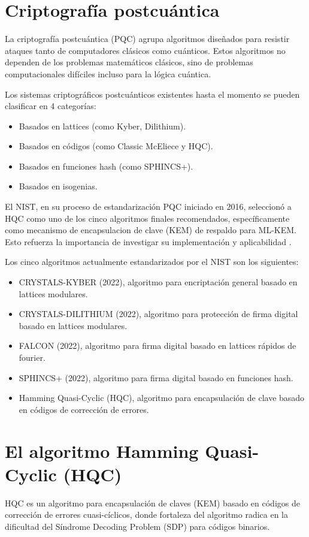 \section{Criptografía postcuántica}
La criptografía postcuántica (PQC) agrupa algoritmos diseñados para resistir ataques tanto de computadores clásicos como cuánticos. Estos algoritmos no dependen de los problemas matemáticos clásicos, sino de problemas computacionales difíciles incluso para la lógica cuántica.

Los sistemas criptográficos postcuánticos existentes hasta el momento se pueden clasificar en 4 categorías:

\begin{itemize}
    \item Basados en lattices (como Kyber, Dilithium).
    \item Basados en códigos (como Classic McEliece y HQC).
    \item Basados en funciones hash (como SPHINCS+).
    \item Basados en isogenias.
\end{itemize}

El NIST, en su proceso de estandarización PQC iniciado en 2016, seleccionó a HQC como uno de los cinco algoritmos finales recomendados, específicamente como mecanismo de encapsulacion de clave (KEM) de respaldo para ML-KEM. Esto refuerza la importancia de investigar su implementación y aplicabilidad \cite{NIST_SelectedPQCAlgorithms}.

Los cinco algoritmos actualmente estandarizados por el NIST son los siguientes:

\begin{itemize}
    \item [1] CRYSTALS-KYBER (2022), algoritmo para encriptación general basado en lattices modulares.
    \item [2] CRYSTALS-DILITHIUM (2022), algoritmo para protección de firma digital basado en lattices modulares.
    \item [3] FALCON (2022), algoritmo para firma digital basado en lattices rápidos de fourier.
    \item [4] SPHINCS+  (2022), algoritmo para firma digital basado en funciones hash.
    \item [5] Hamming Quasi-Cyclic (HQC), algoritmo para encapsulación de clave basado en códigos de corrección de errores.
\end{itemize}

\section{El algoritmo Hamming Quasi-Cyclic (HQC)}
HQC es un algoritmo para encapsulación de claves (KEM) basado en códigos de corrección de errores cuasi-cíclicos, donde fortaleza del algoritmo radica en la dificultad del Síndrome Decoding Problem (SDP) para códigos binarios.

